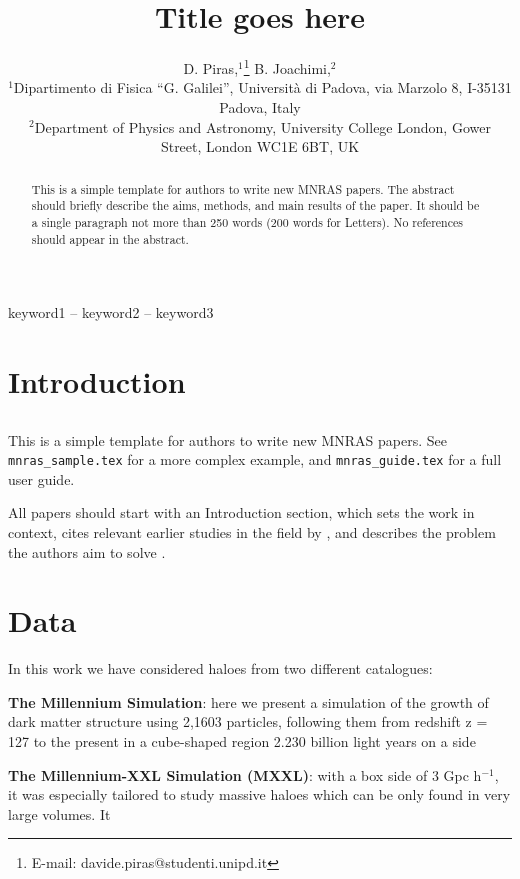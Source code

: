 \documentclass[a4paper,fleqn,usenatbib]{mnras}
\title[Short title, max. 45 characters]{ Title goes here}
\author[D. Piras et al.]{
D. Piras,$^{1}$\thanks{E-mail: davide.piras@studenti.unipd.it}
B. Joachimi,$^{2}$
\\
$^{1}$Dipartimento di Fisica ``G. Galilei'', Universit\`{a} di Padova, via Marzolo 8, I-35131 Padova, Italy\\
$^{2}$Department of Physics and Astronomy, University College London, Gower Street, London WC1E 6BT, UK
}
\begin{document}
\label{firstpage}
\pagerange{\pageref{firstpage}--\pageref{lastpage}}
\maketitle

\begin{abstract}
This is a simple template for authors to write new MNRAS papers.
The abstract should briefly describe the aims, methods, and main results of the paper.
It should be a single paragraph not more than 250 words (200 words for Letters).
No references should appear in the abstract.
\end{abstract}

\begin{keywords}
keyword1 -- keyword2 -- keyword3
\end{keywords}



\section{Introduction}

\subsection{}This is a simple template for authors to write new MNRAS papers.
See \texttt{mnras\_sample.tex} for a more complex example, and \texttt{mnras\_guide.tex}
for a full user guide.

All papers should start with an Introduction section, which sets the work
in context, cites relevant earlier studies in the field by \citet{Others2013},
and describes the problem the authors aim to solve \citep[e.g.][]{Author2012}.

\section{Data}
\label{sec:data}

In this work we have considered haloes from two different catalogues:

\begin{description}
\item \textbf{The Millennium Simulation}: here we present a simulation of the growth of dark matter structure using 2,1603 particles, following them from redshift z = 127 to the present in a cube-shaped region 2.230 billion light years on a side
\item \textbf{The Millennium-XXL Simulation (MXXL)}: with a box side of 3 Gpc h$^{−1}$, it was especially tailored to study massive haloes which can be only found in very large volumes. It 
\end{description}
\end{document}

